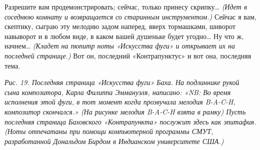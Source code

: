 \documentclass[../main.tex]{subfiles}
\begin{document}
\begin{Dialogue}
 Разрешите вам продемонстрировать; сейчас, только принесу скрипку\ldots{} \emph{(Идет в соседнюю комнату и возвращается со старинным инструментом.)} Сейчас я вам, скептику, сыграю эту мелодию задом наперед, вверх тормашками, шиворот навыворот и в любом виде, в каком вашей душеньке будет угодно\ldots{} Ну что ж, начнем\ldots{} \emph{(Кладет на пюпитр ноты «Искусства фуги» и открывает их на последней странице.)} Вот он, последний «Контрапунктус» и вот она, последняя тема.


\emph{Рис. 19. Последняя страница «Искусства фуги» Баха. На подлиннике рукой сына композитора, Карла Филиппа Эммануэля, написано: «NB: Во время исполнения этой фуги, в тот момент когда прозвучала мелодия \mbox{B-A-C-H}, композитор скончался.» (На рисунке мелодия \mbox{B-A-C-H} взята в рамку) Пусть последняя страница Баховского «Контрапункта» послужит здесь как эпитафия. (Ноты отпечатаны при помощи компьютерной программы СМУТ, разработанной Дональдом Бирдом в Индианском университете США.)}

\end{Dialogue}
\end{document}
